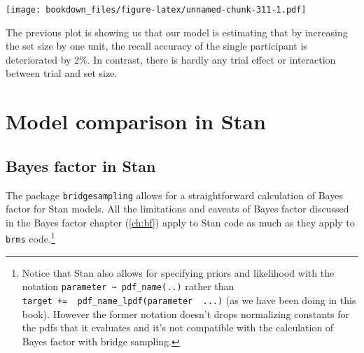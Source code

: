 \documentclass[12pt,]{krantz}
\newenvironment{Shaded}{\begin{snugshade}}{\end{snugshade}}
\newcommand{\DataTypeTok}[1]{\textcolor[rgb]{0.13,0.29,0.53}{#1}}
\newcommand{\FloatTok}[1]{\textcolor[rgb]{0.00,0.00,0.81}{#1}}
\newcommand{\KeywordTok}[1]{\textcolor[rgb]{0.13,0.29,0.53}{\textbf{#1}}}
\newcommand{\NormalTok}[1]{#1}
\newcommand{\OperatorTok}[1]{\textcolor[rgb]{0.81,0.36,0.00}{\textbf{#1}}}
\newcommand{\StringTok}[1]{\textcolor[rgb]{0.31,0.60,0.02}{#1}}
\theoremstyle{definition}
\theoremstyle{definition}
\theoremstyle{definition}
\theoremstyle{remark}
\begin{document}
\begin{Shaded}
\end{Shaded}

\texttt{[image: bookdown\_files/figure-latex/unnamed-chunk-311-1.pdf]}

The previous plot is showing us that our model is estimating that by increasing the set size by one unit, the recall accuracy of the single participant is deteriorated by 2\%. In contrast, there is hardly any trial effect or interaction between trial and set size.

\hypertarget{model-comparison-in-stan}{%
\section{Model comparison in Stan}\label{model-comparison-in-stan}}

\hypertarget{bayes-factor-in-stan}{%
\subsection{Bayes factor in Stan}\label{bayes-factor-in-stan}}

The package \texttt{bridgesampling} allows for a straightforward calculation of Bayes factor for Stan models. All the limitations and caveats of Bayes factor discussed in the Bayes factor chapter (\ref{ch:bf}) apply to Stan code as much as they apply to \texttt{brms} code.\footnote{Notice that Stan also allows for specifying priors and likelihood with the notation \texttt{parameter\ \textasciitilde{}\ pdf\_name(..)} rather than \texttt{target\ +=\ \ pdf\_name\_lpdf(parameter\ \textbar{}\ ...)} (as we have been doing in this book). However the former notation doesn't drops normalizing constants for the pdfs that it evaluates and it's not compatible with the calculation of Bayes factor with bridge sampling.}
\end{document}
